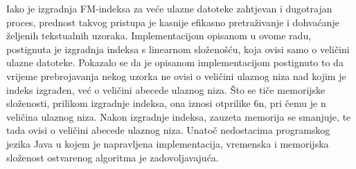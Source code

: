 Iako je izgradnja FM-indeksa za veće ulazne datoteke zahtjevan i dugotrajan proces, prednost takvog pristupa je kasnije efikasno pretraživanje i dohvaćanje željenih tekstualnih uzoraka. Implementacijom opisanom u ovome radu, postignuta je izgradnja indeksa s linearnom složenošću, koja ovisi samo o veličini ulazne datoteke. Pokazalo se da je opisanom implementacijom postignuto to da vrijeme prebrojavanja nekog uzorka ne ovisi o veličini ulaznog niza nad kojim je indeks izgrađen, već o veličini abecede ulaznog niza. Što se tiče memorijske složenosti, prilikom izgradnje indeksa, ona iznosi otprilike 6n, pri čemu je n veličina ulaznog niza. Nakon izgradnje indeksa, zauzeta memorija se smanjuje, te tada ovisi o veličini abecede ulaznog niza. Unatoč nedostacima programskog jezika Java u kojem je napravljena implementacija, vremenska i memorijska složenost ostvarenog algoritma je zadovoljavajuća.